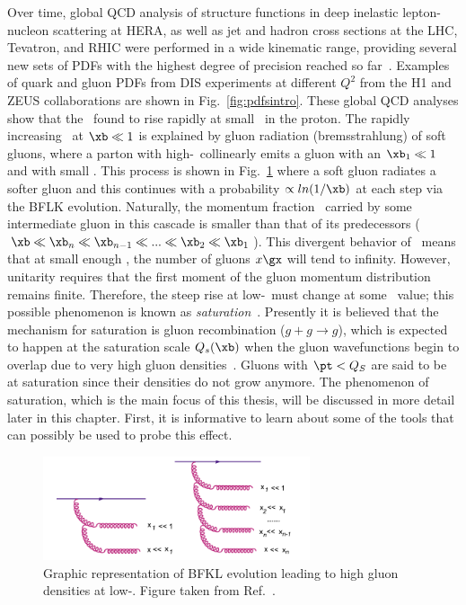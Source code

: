 Over time, global QCD analysis of structure functions in deep inelastic lepton-nucleon scattering at HERA, as well as jet and hadron cross sections at the LHC, Tevatron, and RHIC were performed in a wide kinematic range, providing several new sets of PDFs with the highest degree of precision reached so far~\cite{Dulat:2015mca,Ball:2017nwa,Harland-Lang:2014zoa,Abramowicz:2015mha}. Examples of quark and gluon PDFs from DIS experiments at different $Q^{2}$ from the H1 and ZEUS collaborations are shown in Fig.~\ref{fig:pdfsintro}. These global QCD analyses show that the \gx\ found to rise rapidly at small \xb\ in the proton. The rapidly increasing \gx\ at $\xb \ll 1$ is explained by gluon radiation (bremsstrahlung) of soft gluons, where a parton with high-\xb\ collinearly emits a gluon with an $\xb_{1} \ll 1$ and with small \pt. This process is shown in Fig.~\ref{fig:bfkllowx} where a soft gluon radiates a softer gluon and this continues with a probability $\propto ln(1/\xb)$ at each step via the BFLK evolution. Naturally, the momentum fraction \xb\ carried by some intermediate gluon in this cascade is smaller than that of its predecessors ($\xb \ll \xb_{n} \ll \xb_{n-1} \ll ... \ll \xb_{2} \ll \xb_{1}$). This divergent behavior of \gx\ means that at small enough \xb, the number of gluons $x\gx$ will tend to infinity. However, unitarity requires that the first moment of the gluon momentum distribution remains finite. Therefore, the steep rise at low-\xb\ must change at some \xb\ value; this possible phenomenon is known as \textit{saturation}~\cite{Gribov:1984tu}. Presently it is believed that the mechanism for saturation is gluon recombination ($g + g\rightarrow g$), which is expected to happen at the  saturation scale $Q_{s}(\xb)$ when the gluon wavefunctions begin to overlap due to very high gluon densities~\cite{Mueller:1985wy}. Gluons with $\pt < Q_{S}$ are said to be at saturation since  their densities do not grow anymore. The phenomenon of saturation, which is the main focus of this thesis, will be discussed in more detail later in this chapter. First, it is informative to learn about some of the tools that can possibly be used to probe this effect. 

\begin{figure}
	\centering
	\includegraphics[width=0.7\textwidth]{figures/bfkl.pdf} 
	\caption{ Graphic representation of BFKL evolution leading to high gluon densities at low-\xb. Figure taken from Ref.~\cite{Iancu:2012xa}.}	
	\label{fig:bfkllowx}
\end{figure}

